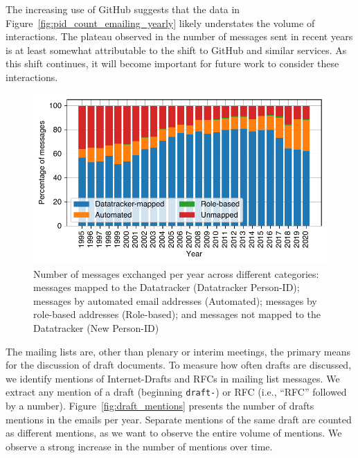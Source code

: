 \documentclass[twocolumn,10pt]{article}
\newlength{\figureWidthOneColumn}
\newcommand{\pb}[1]{\vspace{0.75ex}\noindent{\textbf{#1}}}
\begin{document}
The increasing use of GitHub suggests that the data in
Figure~\ref{fig:pid_count_emailing_yearly} likely understates the volume of
interactions. The plateau observed in the number of messages sent in recent
years is at least somewhat attributable to the shift to GitHub and similar
services. As this shift continues, it will become important for future work
to consider these interactions.

\begin{figure}
  \centering
  \includegraphics[width=\figureWidthOneColumn]{figures-prev/imc-2021/emails/frequency_emails_yearly_categories2.pdf}
  \caption{
    Number of messages exchanged per year across different categories:
    messages mapped to the Datatracker (Datatracker Person-ID); messages
    by automated email addresses (Automated); messages by role-based
    addresses (Role-based); and messages not mapped to the Datatracker
    (New Person-ID)
  }
  \label{fig:emailvol_by_year_catg}
\end{figure}

\pb{Discussion of draft documents:}
The mailing lists are, other than plenary or interim meetings, the primary
means for the discussion of draft documents. To measure how often drafts are
discussed, we identify mentions of Internet-Drafts and RFCs in mailing list
messages.  We extract any mention of a draft (beginning \texttt{draft-}) or
RFC (i.e., ``RFC'' followed by a number).  Figure~\ref{fig:draft_mentions}
presents the number of drafts mentions in the emails per year. Separate
mentions of the same draft are counted as different mentions, as we want to
observe the entire volume of mentions.  We observe a strong increase in the
number of mentions over time.  
\end{document}

